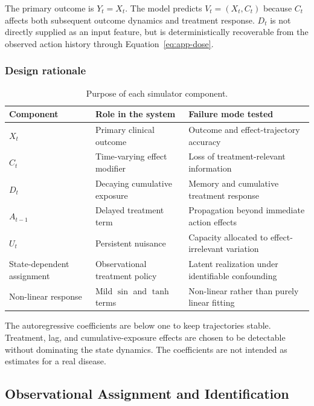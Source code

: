 The primary outcome is $Y_t=X_t$. The model predicts
$V_t=(X_t,C_t)$ because $C_t$ affects both subsequent outcome dynamics
and treatment response. $D_t$ is not directly supplied as an input
feature, but is deterministically recoverable from the observed action
history through Equation~\eqref{eq:app-dose}.

\subsubsection{Design rationale}

\begin{table}[t]
\centering
\small
\caption{Purpose of each simulator component.}
\label{tab:simulator-rationale}
\begin{tabular}{lll}
\toprule
Component & Role in the system & Failure mode tested \\
\midrule
$X_t$ & Primary clinical outcome & Outcome and effect-trajectory accuracy \\
$C_t$ & Time-varying effect modifier & Loss of treatment-relevant information \\
$D_t$ & Decaying cumulative exposure & Memory and cumulative treatment response \\
$A_{t-1}$ & Delayed treatment term & Propagation beyond immediate action effects \\
$U_t$ & Persistent nuisance & Capacity allocated to effect-irrelevant variation \\
State-dependent assignment & Observational treatment policy & Latent realization under identifiable confounding \\
Non-linear response & Mild $\sin$ and $\tanh$ terms & Non-linear rather than purely linear fitting \\
\bottomrule
\end{tabular}
\end{table}

The autoregressive coefficients are below one to keep trajectories
stable. Treatment, lag, and cumulative-exposure effects are chosen to be
detectable without dominating the state dynamics. The coefficients are
not intended as estimates for a real disease.

\subsection{Observational Assignment and Identification}
\label{app:assignment}

